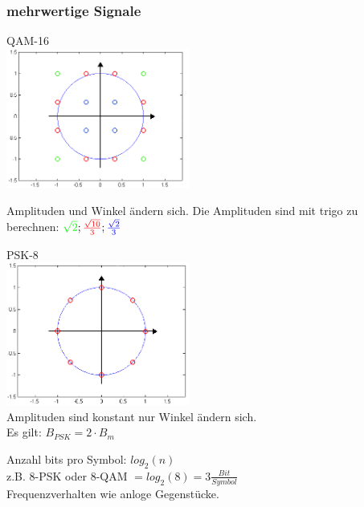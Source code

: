\newpage
\subsubsection{mehrwertige Signale}
\begin{multicols}{2}
    \begin{center}
	QAM-16\\
	\includegraphics[width=6cm]{bilder/qam_16.png}\\
	\end{center}
	Amplituden und Winkel ändern sich.
	Die Amplituden sind mit trigo zu berechnen:
	$\textcolor{green}{\sqrt{2}}; \textcolor{red}{\frac{\sqrt{10}}{3}}; \textcolor{blue}{\frac{\sqrt{2}}{3}}$
	\columnbreak

    \begin{center}
	PSK-8\\
	\includegraphics[width=6cm]{bilder/psk_8.png}\\
	Amplituden sind konstant nur Winkel ändern sich.\\
	Es gilt: $B_{PSK} = 2\cdot B_m$
	\end{center} 

\end{multicols}
	Anzahl bits pro Symbol: $log_2\left(n\right)$\\
	z.B. 8-PSK oder 8-QAM $= log_2(8) = 3 \frac{Bit}{Symbol}$\\
	Frequenzverhalten wie anloge Gegenstücke.
